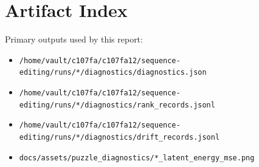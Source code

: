 \documentclass[11pt]{article}
\begin{document}
\section{Artifact Index}

Primary outputs used by this report:

\begin{itemize}
  \item \texttt{/home/vault/c107fa/c107fa12/sequence-editing/runs/*/diagnostics/diagnostics.json}
  \item \texttt{/home/vault/c107fa/c107fa12/sequence-editing/runs/*/diagnostics/rank\_records.jsonl}
  \item \texttt{/home/vault/c107fa/c107fa12/sequence-editing/runs/*/diagnostics/drift\_records.jsonl}
  \item \texttt{docs/assets/puzzle\_diagnostics/*\_latent\_energy\_mse.png}
\end{itemize}
\end{document}
